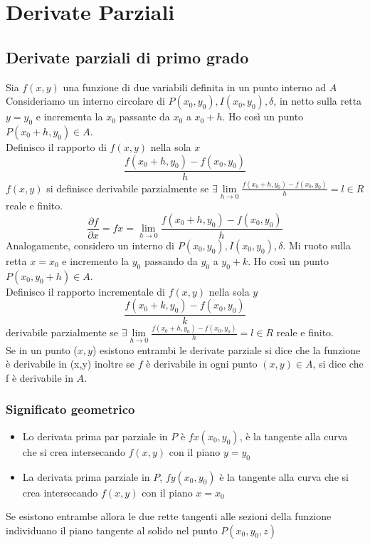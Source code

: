 \chapter{Derivate Parziali}
\section{Derivate parziali di primo grado}
\begin{defi}
  Sia $f(x,y)$ una funzione di due variabili definita in un punto interno ad $A$\\
  Consideriamo un interno circolare di $P(x_0,y_0),I(x_0,y_0), \delta$, in netto sulla retta $y=y_0$ e
  incrementa la $x_0$ passante da $x_0$ a $x_0+h$. Ho così un punto $P(x_0+h,y_0)\in A$.\\
  Definisco il rapporto di $f(x,y)$ nella sola $x$
  \begin{equation}
    \frac{f(x_0+h,y_0)-f(x_0,y_0)}{h}
  \end{equation}
  $f(x,y)$ si definisce {\color{red} derivabile parzialmente} se $\exists \lim\limits_{h\to 0}\frac{f(x_0+h,y_0)-f(x_0,y_0)}{h} = l\in R$ reale e finito.
  \begin{equation}
    \frac{\partial f}{\partial x} =fx=\lim\limits_{h\to 0}\frac{f(x_0+h,y_0)-f(x_0,y_0)}{h}
  \end{equation}
  Analogamente, considero un interno di $P(x_0,y_0), I(x_0,y_0),\delta$. Mi ruoto sulla retta $x=x_0$ e
  incremento la $y_0$ passando da $y_0$ a $y_0+k$. Ho così un punto $P(x_0,y_0+h)\in A$.\\
  Definisco il rapporto incrementale di $f(x,y)$ nella sola $y$
  \begin{equation*}
    \frac{f(x_0+k,y_0)-f(x_0,y_0)}{k}
  \end{equation*}
  {\color{red} derivabile parzialmente} se $\exists \lim\limits_{h\to 0}\frac{f(x_0+h,y_0)-f(x_0,y_0)}{h} =
  l\in R$ reale e finito.\\
  Se in un punto ($x,y$) esistono entrambi le derivate parziale si dice che la funzione è {\color{red} derivabile}
  in (x,y) inoltre se $f$ è derivabile in ogni punto $(x,y)\in A$, si dice che f è derivabile in $A$.
\end{defi}
\subsection{Significato geometrico}
\begin{itemize}
\item Lo derivata prima par parziale in $P$ è $fx(x_0,y_0)$, è la tangente alla curva che si crea intersecando
  $f(x,y)$ con il piano $y=y_0$
\item La derivata prima parziale in $P$, $fy(x_0,y_0)$ è la tangente alla curva che si
  crea intersecando $f(x,y)$ con il piano $x=x_0$
\end{itemize}
Se esistono entrambe allora le due rette tangenti alle sezioni della funzione individuano il piano tangente al
solido nel punto $P(x_0,y_0,z)$
